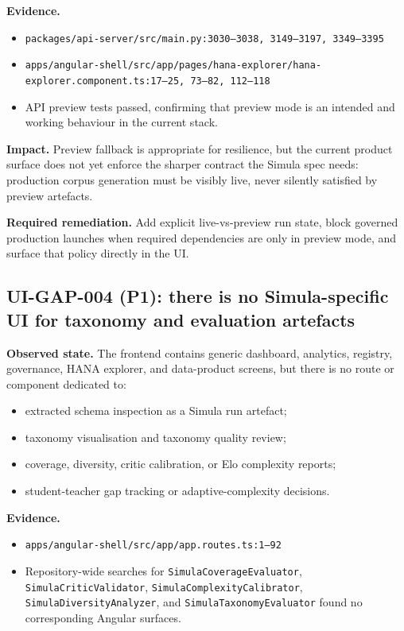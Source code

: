 \textbf{Evidence.}
\begin{itemize}
  \item \texttt{packages/api-server/src/main.py:3030--3038,
    3149--3197, 3349--3395}
  \item \texttt{apps/angular-shell/src/app/pages/hana-explorer/hana-explorer.component.ts:17--25, 73--82, 112--118}
  \item API preview tests passed, confirming that preview mode is an
    intended and working behaviour in the current stack.
\end{itemize}

\textbf{Impact.}
Preview fallback is appropriate for resilience, but the current
product surface does not yet enforce the sharper contract the Simula
spec needs: production corpus generation must be visibly live, never
silently satisfied by preview artefacts.

\textbf{Required remediation.}
Add explicit live-vs-preview run state, block governed production
launches when required dependencies are only in preview mode, and
surface that policy directly in the UI.

\subsection*{UI-GAP-004 (P1): there is no Simula-specific UI for taxonomy and evaluation artefacts}
\textbf{Observed state.}
The frontend contains generic dashboard, analytics, registry,
governance, HANA explorer, and data-product screens, but there is no
route or component dedicated to:
\begin{itemize}
  \item extracted schema inspection as a Simula run artefact;
  \item taxonomy visualisation and taxonomy quality review;
  \item coverage, diversity, critic calibration, or Elo complexity
    reports;
  \item student-teacher gap tracking or adaptive-complexity
    decisions.
\end{itemize}

\textbf{Evidence.}
\begin{itemize}
  \item \texttt{apps/angular-shell/src/app/app.routes.ts:1--92}
  \item Repository-wide searches for
    \texttt{SimulaCoverageEvaluator},
    \texttt{SimulaCriticValidator},
    \texttt{SimulaComplexityCalibrator},
    \texttt{SimulaDiversityAnalyzer}, and
    \texttt{SimulaTaxonomyEvaluator} found no corresponding Angular
    surfaces.
\end{itemize}


